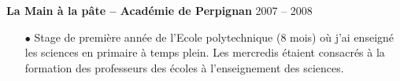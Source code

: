 \documentclass[11pt, a4paper, french]{article}
\begin{document}
\textbf{La Main à la pâte -- Académie de Perpignan} \hfill 2007 -- 2008
\begin{itemize} \itemsep 5pt
    \item[$\bullet$] Stage de première année de l'Ecole polytechnique (8 mois) où
     j'ai enseigné les sciences en primaire à temps plein. Les mercredis étaient
     consacrés à la formation des professeurs des écoles à l'enseignement des sciences.
\end{itemize}










\end{document}

